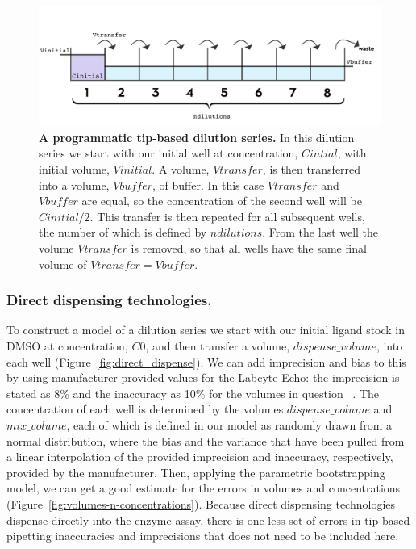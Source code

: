 \documentclass[aps,pre,twocolumn,nofootinbib,superscriptaddress,linenumbers]{revtex4-1}
\begin{document}
\begin{figure}[tb]
    \includegraphics[width=\columnwidth]{../figures/dilution.pdf}

  \caption{{\bf A programmatic tip-based dilution series.}
  In this dilution series we start with our initial well at concentration, $Cintial$, with initial volume, $Vinitial$. A volume, $Vtransfer$, is then transferred into a volume, $Vbuffer$, of buffer. 
  In this case $Vtransfer$ and $Vbuffer$ are equal, so the concentration of the second well will be $Cinitial/2$. This transfer is then repeated for all subsequent wells, the number of which is defined by $ndilutions$. 
  From the last well the volume $Vtransfer$ is removed, so that all wells have the same final volume of $Vtransfer=Vbuffer$.
  }
  \label{fig:dilution}
\end{figure}

\subsubsection*{Direct dispensing technologies.}

To construct a model of a dilution series we start with our initial ligand stock in DMSO at concentration, $C0$, and then transfer a volume, $dispense\_volume$, into each well (Figure~\ref{fig:direct_dispense}). 
We can add imprecision and bias to this by using manufacturer-provided values for the Labcyte Echo: the imprecision is stated as 8\% and the inaccuracy as 10\% for the volumes in question ~\cite{_echo_2011}. 
The concentration of each well is determined by the volumes $dispense\_volume$ and $mix\_volume$, each of which is defined in our model as randomly drawn from a normal distribution, where the bias and the variance that have been pulled from a linear interpolation of the provided imprecision and inaccuracy, respectively, provided by the manufacturer.
Then, applying the parametric bootstrapping model, we can get a good estimate for the errors in volumes and concentrations (Figure~\ref{fig:volumes-n-concentrations}).
Because direct dispensing technologies dispense directly into the enzyme assay, there is one less set of errors in tip-based pipetting inaccuracies and imprecisions that does not need to be included here.
\end{document}
